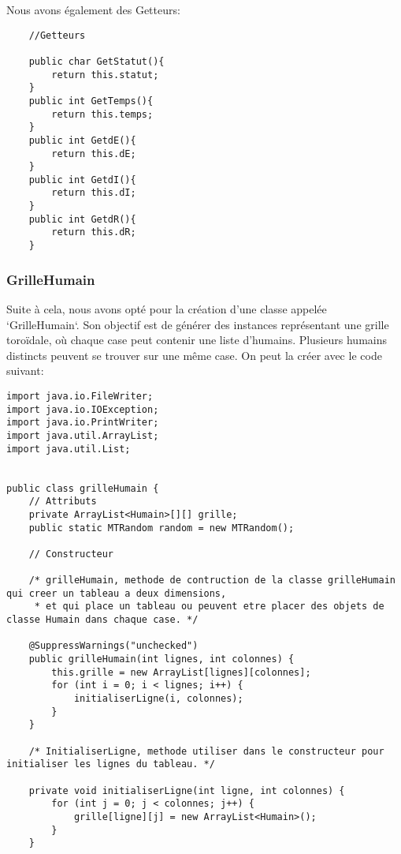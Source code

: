 \documentclass[french]{article}
\begin{document}
Nous avons également des Getteurs:

\begin{lstlisting}
    //Getteurs

    public char GetStatut(){
        return this.statut;
    }
    public int GetTemps(){
        return this.temps;
    }
    public int GetdE(){
        return this.dE;
    }
    public int GetdI(){
        return this.dI;
    }
    public int GetdR(){
        return this.dR;
    }
\end{lstlisting}

\subsubsection{GrilleHumain}

Suite à cela, nous avons opté pour la création d'une classe appelée `GrilleHumain`. Son objectif est de générer des instances représentant une grille toroïdale, où chaque case peut contenir une liste d'humains. Plusieurs humains distincts peuvent se trouver sur une même case.
On peut la créer avec le code suivant:
\begin{lstlisting}
import java.io.FileWriter;
import java.io.IOException;
import java.io.PrintWriter;
import java.util.ArrayList;
import java.util.List;


public class grilleHumain {
    // Attributs
    private ArrayList<Humain>[][] grille;
    public static MTRandom random = new MTRandom();

    // Constructeur

    /* grilleHumain, methode de contruction de la classe grilleHumain qui creer un tableau a deux dimensions,
     * et qui place un tableau ou peuvent etre placer des objets de classe Humain dans chaque case. */

    @SuppressWarnings("unchecked")
    public grilleHumain(int lignes, int colonnes) {
        this.grille = new ArrayList[lignes][colonnes];
        for (int i = 0; i < lignes; i++) {
            initialiserLigne(i, colonnes);
        }
    }

    /* InitialiserLigne, methode utiliser dans le constructeur pour initialiser les lignes du tableau. */

    private void initialiserLigne(int ligne, int colonnes) {
        for (int j = 0; j < colonnes; j++) {
            grille[ligne][j] = new ArrayList<Humain>();
        }
    }
\end{lstlisting}
\end{document}

